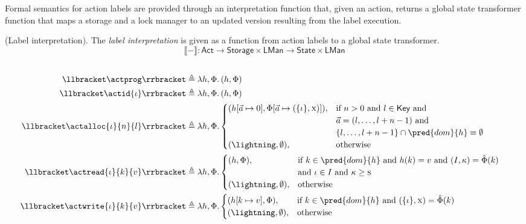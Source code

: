 Formal semantics for action labels are provided through an interpretation function that, given an action, returns a global state transformer function that maps a storage and a lock manager to an updated version resulting from the label execution.
\begin{defn}
	\label{defn:actLabels}
	(Label interpretation).
	The \emph{label interpretation} is given as a function from action labels to a global state transformer.
	\[
		\llbracket - \rrbracket
			:
		\mathsf{Act} \rightarrow
		\mathsf{Storage} \times \mathsf{LMan} \rightarrow
		\mathsf{State} \times \mathsf{LMan}
	\]
	\begin{align*}\\
		\llbracket \actprog \rrbracket &\triangleq \lambda h, \Phi \ldotp (h,\Phi) \\
		\llbracket \actid{\iota} \rrbracket &\triangleq \lambda h, \Phi \ldotp (h,\Phi) \\
		\llbracket \actalloc{\iota}{n}{l} \rrbracket &\triangleq \lambda h, \Phi \ldotp
			\begin{cases}
				(h[\vec{a} \mapsto 0], \Phi[\vec{a} \mapsto (\{ \iota \}, \textsc{x})]),
				&
				\text{if } n > 0 \text{ and } l \in \mathsf{Key} \text{ and } \\
				& \vec{a} = (l, \ldots, l + n - 1) \text{ and } \\
				& \{ l, \ldots, l + n - 1 \} \cap \pred{dom}{h} \equiv \emptyset \\
				(\lightning, \emptyset), & \text{otherwise}
			\end{cases}
	\\
	\llbracket \actread{\iota}{k}{v} \rrbracket &\triangleq \lambda h, \Phi \ldotp
	\begin{cases}
	(h, \Phi), & \text{if } k \in \pred{dom}{h} \text{ and } h(k) = v \text{ and } (I, \kappa) = \hat{\Phi}(k) \\ & \text{and } \iota \in I \text{ and } \kappa \geq \textsc{s} \\
	(\lightning, \emptyset), & \text{otherwise}
	\end{cases} \\
	\llbracket \actwrite{\iota}{k}{v} \rrbracket &\triangleq \lambda h, \Phi \ldotp
	\begin{cases}
	(h[k \mapsto v], \Phi), & \text{if } k \in \pred{dom}{h} \text{ and } (\{\iota\}, \textsc{x}) = \hat{\Phi}(k) \\
	(\lightning, \emptyset), & \text{otherwise}
	\end{cases} \\

\end{align*}
\end{defn}
